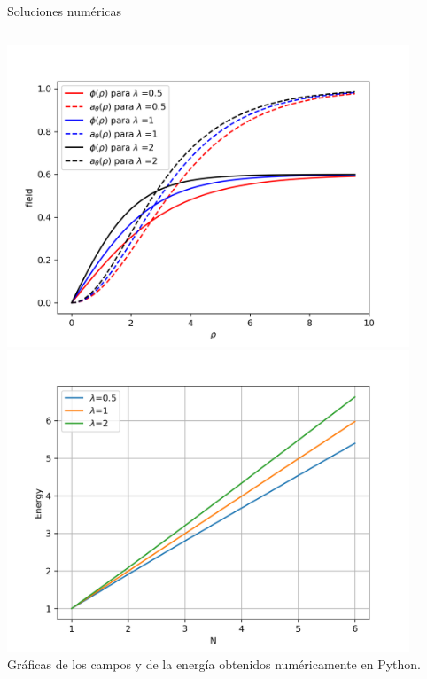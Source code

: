 \documentclass[11pt,t]{beamer}
\begin{document}
\begin{frame}{Soluciones numéricas}

\begin{columns}
\includegraphics[width=0.9\textwidth]{fields.png}\\
\includegraphics[width=0.9\textwidth]{Energy.png}
Gráficas de los campos y de la energía obtenidos numéricamente en Python.
\end{columns}
    
\end{frame}
\end{document}
